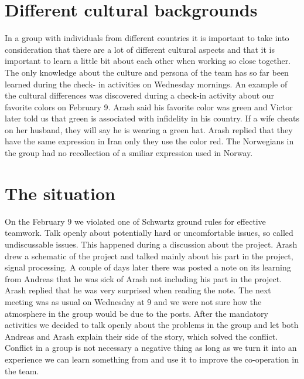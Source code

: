 \section{Different cultural backgrounds}
In a group with individuals from different countries it is important to take into consideration that there are a lot of different cultural aspects and that it is important to learn a little bit about each other when working so close together. The only knowledge about the culture and persona of the team has so far been learned during the check- in activities on Wednesday mornings. An example of the cultural differences was discovered during a check-in activity about our favorite colors on February 9. Arash said his favorite color was green and Victor later told us that green is associated with infidelity in his country. If a wife cheats on her husband, they will say he is wearing a green hat. Arash replied that they have the same expression in Iran only they use the color red. The Norwegians in the group had no recollection of a smiliar expression used in Norway. %

\section{The situation}
On the February 9 we violated one of Schwartz ground rules for effective teamwork. Talk openly about potentially hard or uncomfortable issues, so called undiscussable issues. This happened during a discussion about the project. Arash drew a schematic of the project and talked mainly about his part in the project, signal processing. A couple of days later there was posted a note on its learning from Andreas that he was sick of Arash not including his part in the project. Arash replied that he was very surprised when reading the note. The next meeting was as usual on Wednesday at 9 and we were not sure how the atmosphere in the group would be due to the posts. After the mandatory activities we decided to talk openly about the problems in the group and let both Andreas and Arash explain their side of the story, which solved the conflict. Conflict in a group is not necessary a negative thing as long as we turn it into an experience we can learn something from and use it to improve the co-operation in the team. 


